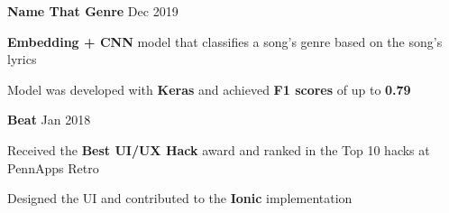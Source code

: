 



\begin{cventries}


\cventry
{\textbf{Name That Genre}}
{Dec 2019} %
{ %
\begin{cvitems}
\item {\textbf{Embedding + CNN} model that classifies a song's genre based on the song's lyrics}
\item {Model was developed with \textbf{Keras} and achieved \textbf{F1 scores} of up to \textbf{0.79}}
\end{cvitems}
}




\cventry
{\textbf{Beat}}
{Jan 2018} %
{ %
\begin{cvitems}
\item {Received the \textbf{Best UI/UX Hack} award and ranked in the Top 10 hacks at PennApps Retro}
\item {Designed the UI and contributed to the \textbf{Ionic} implementation}
\end{cvitems}
}


\end{cventries}
